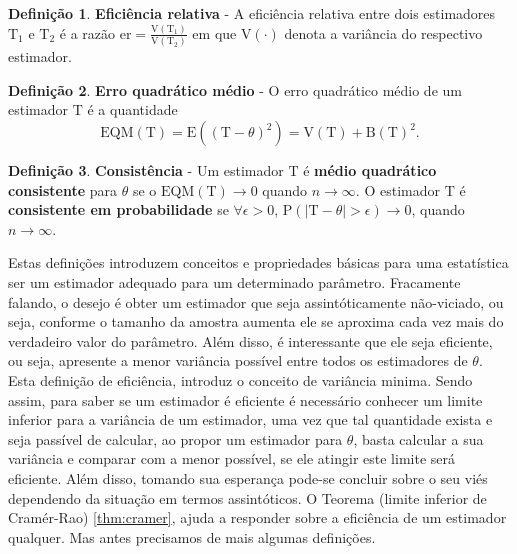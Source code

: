 \documentclass[
  9pt,
  a5paper,
]{book}
\theoremstyle{definition}
\newtheorem{definition}{Definição}[chapter]
\theoremstyle{definition}
\theoremstyle{definition}
\theoremstyle{definition}
\theoremstyle{remark}
\begin{document}
\begin{definition}
\protect\hypertarget{def:unnamed-chunk-9}{}\label{def:unnamed-chunk-9}\textbf{Eficiência relativa} - A eficiência relativa entre dois estimadores \(\mathrm{T_1}\) e \(\mathrm{T_2}\) é a razão \(\mathrm{er} = \frac{\mathrm{V}(\mathrm{T_1})}{\mathrm{V}(\mathrm{T_2})}\) em que \(\mathrm{V}(\cdot)\) denota a variância do respectivo estimador.
\end{definition}

\begin{definition}
\protect\hypertarget{def:unnamed-chunk-10}{}\label{def:unnamed-chunk-10}\textbf{Erro quadrático médio} - O erro quadrático médio de um estimador \(\mathrm{T}\) é a quantidade \[ \mathrm{EQM}(\mathrm{T}) = \mathrm{E}( ( \mathrm{T} - \theta)^2 ) = \mathrm{V}(\mathrm{T}) + \mathrm{B}(\mathrm{T})^2 . \]
\end{definition}

\begin{definition}
\protect\hypertarget{def:unnamed-chunk-11}{}\label{def:unnamed-chunk-11}\textbf{Consistência} - Um estimador \(\mathrm{T}\) é \textbf{médio quadrático consistente} para \(\theta\) se o \(\mathrm{EQM}(\mathrm{T}) \to 0\) quando \(n \to \infty\). O estimador \(\mathrm{T}\) é \textbf{consistente em probabilidade} se \(\forall \epsilon > 0\), \(\mathrm{P}( | \mathrm{T} - \theta | > \epsilon) \to 0\), quando \(n \to \infty\).
\end{definition}

Estas definições introduzem conceitos e propriedades básicas para uma estatística ser um estimador adequado para um determinado parâmetro. Fracamente falando, o desejo é obter um estimador que seja assintóticamente não-viciado, ou seja, conforme o tamanho da amostra aumenta ele se aproxima cada vez mais do verdadeiro valor do parâmetro. Além disso, é interessante que ele seja eficiente, ou seja, apresente a menor variância possível entre todos os estimadores de \(\theta\). Esta definição de eficiência, introduz o conceito de variância minima. Sendo assim, para saber se um estimador é eficiente é necessário conhecer um limite inferior para a variância de um estimador, uma vez que tal quantidade exista e seja passível de calcular, ao propor um estimador para \(\theta\), basta calcular a sua variância e comparar com a menor possível, se ele atingir este limite será eficiente. Além disso, tomando sua esperança pode-se concluir sobre o seu viés dependendo da situação em termos assintóticos. O Teorema (limite inferior de Cramér-Rao) \ref{thm:cramer}, ajuda a responder sobre a eficiência de um estimador qualquer. Mas antes precisamos de mais algumas definições.
\end{document}
